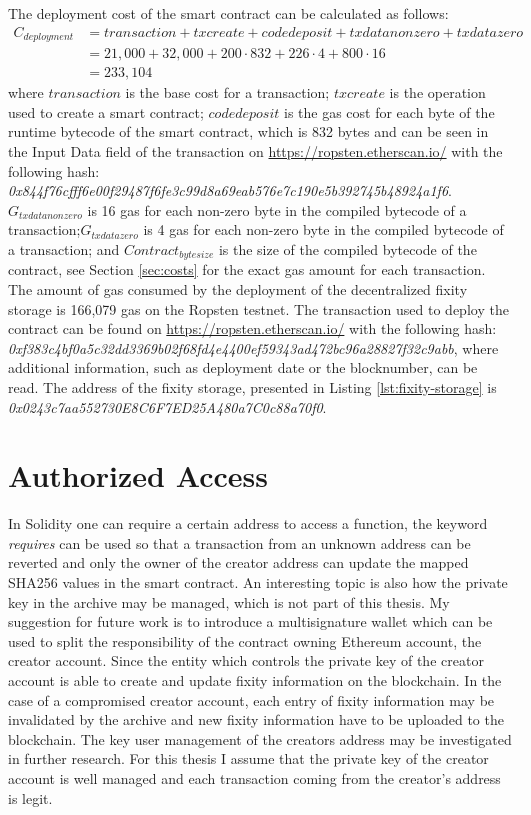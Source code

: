 The deployment cost of the smart contract can be calculated as follows:
\begin{equation}\label{eq:create-cost}
  \begin{split}
      C_{deployment} & = transaction + txcreate + codedeposit + txdatanonzero + txdatazero \\
      & = 21,000 + 32,000 + 200 \cdot 832 + 226 \cdot 4 + 800 \cdot 16 \\
      & = 233,104
  \end{split}
\end{equation}
where $transaction$ is the base cost for a transaction; $txcreate$ is the operation used to create a smart contract; $codedeposit$ is the gas cost for each byte of the runtime bytecode of the smart contract, which is 832 bytes and can be seen in the Input Data field of the transaction on \url{https://ropsten.etherscan.io/} with the following hash: \textit{0x844f76cfff6e00f29487f6fe3c99d8a69eab576e7c190e5b392745b48924a1f6}.
\textit{$G_{txdatanonzero}$} is 16 gas for each non-zero byte in the compiled bytecode of a transaction;\textit{$G_{txdatazero}$} is 4 gas for each non-zero byte in the compiled bytecode of a transaction; and \textit{$Contract_{bytesize}$} is the size of the compiled bytecode of the contract, see Section \ref{sec:costs} for the exact gas amount for each transaction.
The amount of gas consumed by the deployment of the decentralized fixity storage is 166,079 gas on the Ropsten testnet. The transaction used to deploy the contract can be found on \url{https://ropsten.etherscan.io/} with the following hash: \textit{0xf383c4bf0a5c32dd3369b02f68fd4e4400ef59343ad472bc96a28827f32c9abb}, where additional information, such as deployment date or the blocknumber, can be read. The address of the fixity storage, presented in Listing \ref{lst:fixity-storage} is \textit{0x0243c7aa552730E8C6F7ED25A480a7C0c88a70f0}.
\section{Authorized Access}
In Solidity one can require a certain address to access a function, the keyword \textit{requires} can be used so that a transaction from an unknown address can be reverted and only the owner of the creator address can update the mapped SHA256 values in the smart contract. An interesting topic is also how the private key in the archive may be managed, which is not part of this thesis. My suggestion for future work is to introduce a multisignature wallet which can be used to split the responsibility of the contract owning Ethereum account, the creator account. Since the entity which controls the private key of the creator account is able to create and update fixity information on the blockchain. In the case of a compromised creator account, each entry of fixity information may be invalidated by the archive and new fixity information have to be uploaded to the blockchain. The key user management of the creators address may be investigated in further research. For this thesis I assume that the private key of the creator account is well managed and each transaction coming from the creator's address is legit.
